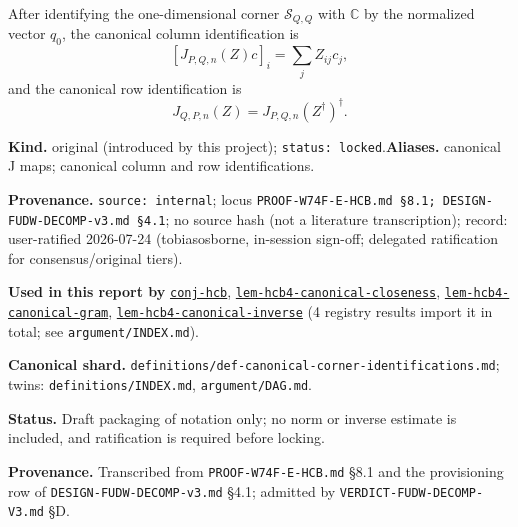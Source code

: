\hypertarget{def:canonical-corner-identifications}{}%
\begin{definition}\label{def:canonical-corner-identifications}
After identifying the one-dimensional corner
\(\mathcal S_{Q,Q}\) with \(\mathbb C\) by the normalized vector \(q_0\), the
canonical column identification is
\[
[J_{P,Q,n}(Z)c]_i=\sum_j Z_{ij}c_j,
\]
and the canonical row identification is
\[
J_{Q,P,n}(Z)=J_{P,Q,n}(Z^\dagger)^\dagger.
\]
\end{definition}
\begin{defnote}
\textbf{Kind.} original (introduced by this project); \texttt{status: locked}.\quad\textbf{Aliases.} canonical J maps; canonical column and row identifications.
\par
\textbf{Provenance.} \texttt{source: internal}; locus \texttt{PROOF-\allowbreak{}W74F-\allowbreak{}E-\allowbreak{}HCB.\allowbreak{}md \S{}8.\allowbreak{}1;\allowbreak{} DESIGN-\allowbreak{}FUDW-\allowbreak{}DECOMP-\allowbreak{}v3.\allowbreak{}md \S{}4.\allowbreak{}1}; no source hash (not a literature transcription); record: user-\allowbreak{}ratified 2026-\allowbreak{}07-\allowbreak{}24 (tobiasosborne,\allowbreak{} in-\allowbreak{}session sign-\allowbreak{}off;\allowbreak{} delegated ratification for consensus/\allowbreak{}original tiers).
\par
\textbf{Used in this report by} \hyperref[conj:hcb]{\texttt{conj-\allowbreak{}hcb}}, \hyperref[lem:hcb4-canonical-closeness]{\texttt{lem-\allowbreak{}hcb4-\allowbreak{}canonical-\allowbreak{}closeness}}, \hyperref[lem:hcb4-canonical-gram]{\texttt{lem-\allowbreak{}hcb4-\allowbreak{}canonical-\allowbreak{}gram}}, \hyperref[lem:hcb4-canonical-inverse]{\texttt{lem-\allowbreak{}hcb4-\allowbreak{}canonical-\allowbreak{}inverse}} (4 registry results import it in total; see \texttt{argument/INDEX.md}).
\par
\textbf{Canonical shard.} \texttt{definitions/\allowbreak{}def-\allowbreak{}canonical-\allowbreak{}corner-\allowbreak{}identifications.\allowbreak{}md}; twins: \texttt{definitions/INDEX.md}, \texttt{argument/DAG.md}.
\par
\textbf{Status.} Draft packaging of notation only; no norm or inverse estimate is
included, and ratification is required before locking.

\textbf{Provenance.} Transcribed from \texttt{PROOF-\allowbreak{}W74F-\allowbreak{}E-\allowbreak{}HCB.\allowbreak{}md} \S{}8.1 and the
provisioning row of \texttt{DESIGN-\allowbreak{}FUDW-\allowbreak{}DECOMP-\allowbreak{}v3.\allowbreak{}md} \S{}4.1; admitted by
\texttt{VERDICT-\allowbreak{}FUDW-\allowbreak{}DECOMP-\allowbreak{}V3.\allowbreak{}md} \S{}D.
\end{defnote}

